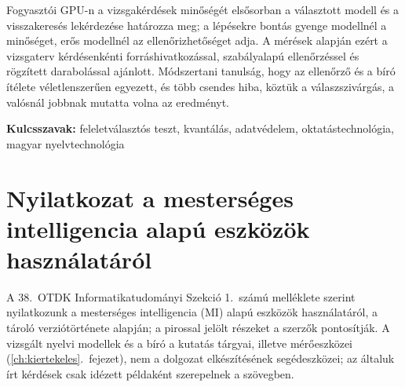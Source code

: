 Fogyasztói GPU-n a vizsgakérdések minőségét elsősorban a választott modell és a visszakeresés lekérdezése
határozza meg; a lépésekre bontás gyenge modellnél a minőséget, erős modellnél az ellenőrizhetőséget adja. A
mérések alapján ezért a vizsgaterv kérdésenkénti forráshivatkozással, szabályalapú ellenőrzéssel és rögzített
darabolással ajánlott. Módszertani tanulság, hogy az ellenőrző és a bíró ítélete véletlenszerűen egyezett, és
több csendes hiba, köztük a válaszszivárgás, a valósnál jobbnak mutatta volna az eredményt.

\medskip
\noindent\textbf{Kulcsszavak:} feleletválasztós teszt, kvantálás, adatvédelem, oktatástechnológia, magyar
nyelvtechnológia

\chapter{Nyilatkozat a mesterséges intelligencia alapú eszközök használatáról}
\label{app-mi-nyilatkozat}

A 38.~OTDK Informatikatudományi Szekció 1.~számú melléklete szerint nyilatkozunk a mesterséges intelligencia
(MI) alapú eszközök használatáról, a tároló verziótörténete alapján; a pirossal jelölt részeket a szerzők
pontosítják. A vizsgált nyelvi modellek és a bíró a kutatás tárgyai, illetve mérőeszközei
(\ref{ch:kiertekeles}.~fejezet), nem a dolgozat elkészítésének segédeszközei; az általuk írt kérdések csak
idézett példaként szerepelnek a szövegben.

